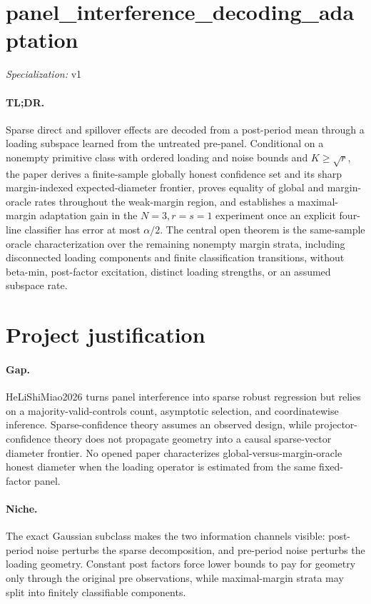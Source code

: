\documentclass{article}
\begin{document}
\sloppy

\section*{panel\_\allowbreak{}interference\_\allowbreak{}decoding\_\allowbreak{}adaptation}

\noindent\textit{Specialization:} v1\par

\paragraph{TL;DR.} Sparse direct and spillover effects are decoded from a post-period mean through a loading subspace learned from the untreated pre-panel. Conditional on a nonempty primitive class with ordered loading and noise bounds and \(K\ge\sqrt r\), the paper derives a finite-sample globally honest confidence set and its sharp margin-indexed expected-diameter frontier, proves equality of global and margin-oracle rates throughout the weak-margin region, and establishes a maximal-margin adaptation gain in the \(N=3,r=s=1\) experiment once an explicit four-line classifier has error at most \(\alpha/2\). The central open theorem is the same-sample oracle characterization over the remaining nonempty margin strata, including disconnected loading components and finite classification transitions, without beta-min, post-factor excitation, distinct loading strengths, or an assumed subspace rate.

\section{Project justification}

\paragraph{Gap.} HeLiShiMiao2026 turns panel interference into sparse robust regression but relies on a majority-valid-controls count, asymptotic selection, and coordinatewise inference. Sparse-confidence theory assumes an observed design, while projector-confidence theory does not propagate geometry into a causal sparse-vector diameter frontier. No opened paper characterizes global-versus-margin-oracle honest diameter when the loading operator is estimated from the same fixed-factor panel.

\paragraph{Niche.} The exact Gaussian subclass makes the two information channels visible: post-period noise perturbs the sparse decomposition, and pre-period noise perturbs the loading geometry. Constant post factors force lower bounds to pay for geometry only through the original pre observations, while maximal-margin strata may split into finitely classifiable components.
\end{document}
